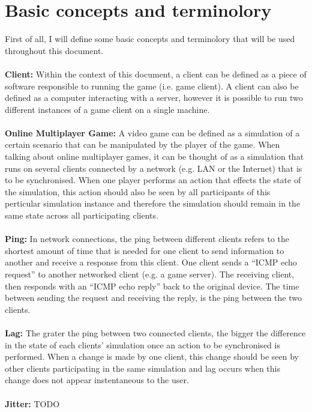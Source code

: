 \section{Basic concepts and terminolory}
First of all, I will define some basic concepts and terminolory that will be used throughout this document.
\\
\\
\textbf{Client:} Within the context of this document, a client can be defined as a piece of software responsible to running the game (i.e. game client). A client can also be defined as a computer interacting with a server, however it is possible to run two different instances of a game client on a single machine.
\\
\\
\textbf{Online Multiplayer Game:} A video game can be defined as a simulation of a certain scenario that can be manipulated by the player of the game. When talking about online multiplayer games, it can be thought of as a simulation that runs on several clients connected by a network (e.g. LAN or the Internet) that is to be synchronised. When one player performs an action that effects the state of the simulation, this action should also be seen by all participants of this perticular simulation instance and therefore the simulation should remain in the same state across all participating clients.
\\
\\
\textbf{Ping:} In network connections, the ping between different clients refers to the shortest amount of time that is needed for one client to send information to another and receive a response from this client. One client sends a ``ICMP echo request'' to another networked client (e.g. a game server). The receiving client, then responds with an ``ICMP echo reply'' back to the original device. The time between sending the request and receiving the reply, is the ping between the two clients.
\\
\\
\textbf{Lag:} The grater the ping between two connected clients, the bigger the difference in the state of each clients' simulation once an action to be synchronised is performed. When a change is made by one client, this change should be seen by other clients participating in the same simulation and lag occurs when this change does not appear instentaneous to the user.
\\
\\
\textbf{Jitter:} TODO


\newpage
